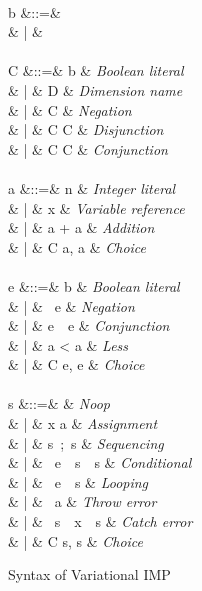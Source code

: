 \documentclass[onehalf,11pt]{beavtex}
\newcommand{\tagtree}[3]{#1 \langle #2, #3 \rangle}
\begin{document}
\begin{figure}
\begin{syntax}
 \\
b &::=&  \\
& | &  \\
\\
C &::=& b & \textit{Boolean literal} \\
& | & D & \textit{Dimension name} \\
& | & \neg C & \textit{Negation} \\
& | & C \vee C & \textit{Disjunction} \\
& | & C \wedge C & \textit{Conjunction} \\
\\
a &::=& n & \textit{Integer literal} \\
& | & x & \textit{Variable reference} \\
& | & a + a & \textit{Addition} \\
& | & \tagtree{C}{a}{a} & \textit{Choice} \\
 \\
e &::=& b & \textit{Boolean literal} \\
& | & \ e & \textit{Negation} \\
& | & e\ \ e & \textit{Conjunction} \\
& | & a < a & \textit{Less} \\
& | & \tagtree{C}{e}{e} & \textit{Choice} \\
 \\
s &::=&  & \textit{Noop} \\
& | & x \coloneqq a & \textit{Assignment} \\
& | & s\ ;\ s & \textit{Sequencing} \\
& | & \ e\ \ s\ \ s & \textit{Conditional} \\
& | & \ e\ \ s & \textit{Looping} \\
& | & \ a & \textit{Throw error} \\
& | & \ s\ \ x\ \ s & \textit{Catch error} \\
& | & \tagtree{C}{s}{s} & \textit{Choice}
\end{syntax}
\caption{Syntax of Variational IMP}
\label{fig:vimpsyn}
\end{figure}
\end{document}
